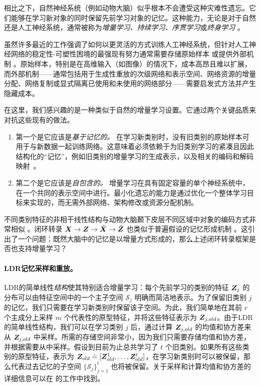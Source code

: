 \documentclass[../../book-main.tex]{subfiles}
\begin{document}
相比之下，自然神经系统（例如动物大脑）似乎根本不会遭受这种灾难性遗忘。它们能够在学习新对象的同时保留先前学习对象的记忆。这种能力，无论是对于自然还是人工神经系统，通常被称为{\em 增量学习、持续学习、序贯学习}或{\em 终身学习} \cite{controlled-forgetting}。



虽然许多最近的工作强调了如何以更灵活的方式训练人工神经系统，但针对人工神经网络的稳定性-可塑性困境的最强现有努力通常需要存储原始样本 \cite{icarl,chaudhry2019tiny} 或提供外部机制 \cite{EWC}。原始样本，特别是在高维输入（如图像）的情况下，成本高昂且难以扩展，而外部机制——通常包括用于生成性重放的次级网络和表示空间、网络资源的增量分配、网络复制或显式隔离已使用和未使用的网络部分——需要启发式方法并产生隐藏成本。


在这里，我们感兴趣的是一种类似于自然的增量学习设置。它通过两个关键品质来对抗这些现有的做法。
\begin{enumerate}
    \item 第一个是它应该是\emph{基于记忆的。} 在学习新类别时，没有旧类别的原始样本可用于与新数据一起训练网络。这意味着必须依赖于为旧类别学习的紧凑且因此结构化的“记忆”，例如旧类别的增量学习的生成表示，以及相关的编码和解码映射~\cite{fearnet}。
    \item 第二个是它应该是\emph{自包含的。} 增量学习在具有固定容量的单个神经系统中，在一个共同的表示空间中进行。最小化遗忘的能力是通过优化一个整体学习目标来实现的，而无需外部网络、架构修改或资源分配机制。
\end{enumerate}

不同类别特征的非相干线性结构与动物大脑颞下皮层不同区域中对象的编码方式非常相似 \cite{Chang-Cell-2017,Bao2020AMO}。闭环转录 $\bm{X} \rightarrow \bm{Z} \rightarrow \hat{\bm{X}} \rightarrow \hat{\bm{Z}}$ 也类似于普遍假设的记忆形成机制 \cite{2020Vandeven,Josselyn2020MemoryER}。这引出了一个问题：既然大脑中的记忆是以增量方式形成的，那么上述闭环转录框架是否也支持增量学习？

\paragraph{LDR记忆采样和重放。} LDR的简单线性{\em 结构}使其特别适合增量学习：每个先前学习的类别的特征 $\bm{Z}_j$ 的分布可以由特征空间中的一个主子空间 $\mathcal{S}_j$ 明确而简洁地表示。为了保留旧类别 $j$ 的记忆，我们只需要在学习新类别时保留该子空间。为此，我们简单地在其前 $r$ 个主成分上采样 $m$ 个代表性的原型特征，并将这些特征表示为 $\bm{Z}_{j,old}$。由于LDR的简单线性结构，我们可以在学习类别 $j$ 后，通过计算 $\bm{Z}_{j,old}$ 的均值和协方差来从 $\bm{Z}_{j,old}$ 中采样。所需的存储空间非常小，因为我们只需要存储均值和协方差，并根据需要从中采样。假设到目前为止总共学习了 $t$ 个旧类别。如果所有这些类别的原型特征，表示为 $\bm{Z}_{old} \doteq [\bm{Z}^1_{old},\ldots, \bm{Z}^t_{old}]$，在学习新类别时可以被保留，那么代表过去记忆的子空间 $\{\mathcal{S}_j\}_{j=1}^t$ 也将被保留。关于采样和计算均值和协方差的详细信息可以在 \cite{tong2023incremental} 的工作中找到。
\end{document}
